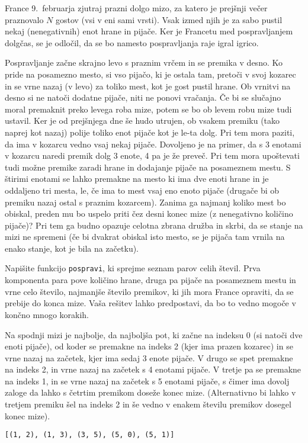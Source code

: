 \documentclass[arhiv]{../izpit}
\begin{document}


\naloga

France 9.~februarja zjutraj prazni dolgo mizo, za katero je prejšnji večer praznovalo $N$ gostov (vsi v eni sami vrsti). Vsak izmed njih je za sabo pustil nekaj (nenegativnih) enot hrane in pijače. Ker je Francetu med pospravljanjem dolgčas, se je odločil, da se bo namesto pospravljanja raje igral igrico.

Pospravljanje začne skrajno levo s praznim vrčem in se premika v desno. Ko pride na posamezno mesto, si vso pijačo, ki je ostala tam, pretoči v svoj kozarec in se vrne nazaj (v levo) za toliko mest, kot je gost pustil hrane. Ob vrnitvi na desno si ne natoči dodatne pijače, niti ne ponovi vračanja. Če bi se slučajno moral premaknit preko levega roba mize, potem se bo ob levem robu mize tudi ustavil. Ker je od prejšnjega dne še hudo utrujen, ob vsakem premiku (tako naprej kot nazaj) polije toliko enot pijače kot je le-ta dolg. Pri tem mora paziti, da ima v kozarcu vedno vsaj nekaj pijače. Dovoljeno je na primer, da s 3 enotami v kozarcu naredi premik dolg 3 enote, 4 pa je že preveč. Pri tem mora upoštevati tudi možne premike zaradi hrane in dodajanje pijače na posameznem mestu. S štirimi enotami se lahko premakne na mesto ki ima dve enoti hrane in je oddaljeno tri mesta, le, če ima to mest vsaj eno enoto pijače (drugače bi ob premiku nazaj ostal s praznim kozarcem). Zanima ga najmanj koliko mest bo obiskal, preden mu bo uspelo priti čez desni konec mize (z nenegativno količino pijače)? Pri tem ga budno opazuje celotna zbrana družba in skrbi, da se stanje na mizi ne spremeni (če bi dvakrat obiskal isto mesto, se je pijača tam vrnila na enako stanje, kot je bila na začetku).

Napišite funkcijo \verb|pospravi|, ki sprejme seznam parov celih števil. Prva komponenta para pove količino hrane, druga pa pijače na posameznem mestu in vrne celo število, najmanjše število premikov, ki jih mora France opraviti, da se prebije do konca mize. Vaša rešitev lahko predpostavi, da bo to vedno mogoče v končno mnogo korakih.

Na spodnji mizi je najbolje, da najboljša pot, ki začne na indeksu 0 (si natoči dve enoti pijače), od koder se premakne na indeks 2 (kjer ima prazen kozarec) in se vrne nazaj na začetek, kjer ima sedaj 3 enote pijače. V drugo se spet premakne na indeks 2, in vrne nazaj na začetek s 4 enotami pijače. V tretje pa se premakne na indeks 1, in se vrne nazaj na začetek s 5 enotami pijače, s čimer ima dovolj zaloge da lahko s četrtim premikom doseže konec mize. (Alternativno bi lahko v tretjem premiku šel na indeks 2 in še vedno v enakem številu premikov dosegel konec mize).


\verb|[(1, 2), (1, 3), (3, 5), (5, 0), (5, 1)]|
\end{document}
